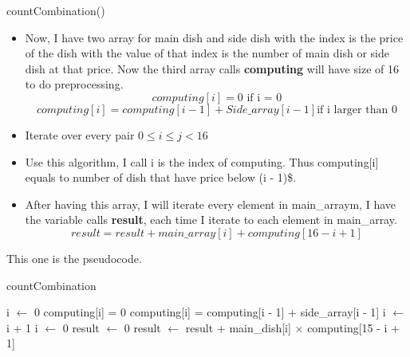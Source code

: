 \documentclass{article}
\begin{document}
	countCombination()
	\begin{itemize}
		\item Now, I have two array for main dish and side dish with the index is the price of the dish with the value of that index is the number of main dish or side dish at that price. Now the third array calls \textbf{computing} will have size of 16 to do preprocessing.
		\[computing[i] = 0 \text{ if i = 0}\]
		\[computing[i] = computing[i - 1] + Side\_array[i -1] \text{if i larger than 0}\]
		\item Iterate over every pair \(0 \leq i \leq j < 16\)
		\item Use this algorithm, I call i is the index of computing. Thus computing[i] equals to number of dish that have price below (i - 1)\$.
		\item After having this array, I will iterate every element in main\_arraym, I have the variable calls \textbf{result}, each time I iterate to each element in main\_array.
		\[result = result + main\_array[i] + computing[16 - i + 1]\]
	\end{itemize}
	
	This one is the pseudocode.

	\begin{algorithm}[H]
		\caption{countCombination}
	\begin{algorithmic}[1]
		\State i \(\leftarrow\) 0 
				\State computing[i] = 0
			\Else{}
				\State computing[i] = computing[i - 1] + side\_array[i - 1]
			\EndIf{}
			\State i \(\leftarrow\) i + 1
		\EndWhile{}
		\State i \(\leftarrow\) 0 
		\State result \(\gets\) 0
			\State result \(\gets\) result + main\_dish[i] \(\times\) computing[15 - i + 1]
		\EndWhile{}
		\State {}
		\EndFunction{}
	\end{algorithmic}
	\end{algorithm}
\end{document}
